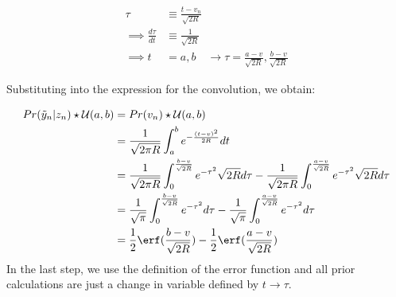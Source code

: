 \begin{align}
\tau & \equiv \frac{t-v_n}{\sqrt{2R}} \\
\implies \frac{d\tau}{dt} & \equiv \frac{1}{\sqrt{2R}} \\
\implies t& = a, b \quad \to \tau = \frac{a-v}{\sqrt{2R}}, \frac{b-v}{\sqrt{2R}} 
\end{align}

Substituting into the expression for the convolution, we obtain:

\begin{align}
Pr( \tilde{y}_n | z_n) \star \mathcal{U}(a,b) & =  Pr( v_n) \star \mathcal{U}(a,b) \\
& = \frac{1}{\sqrt{2\pi R}} \int_{a}^{b} e^{-\frac{(t-v)^2}{2R}} dt\\
& = \frac{1}{\sqrt{2\pi R}} \int_{0}^{\frac{b-v}{\sqrt{2R}} } e^{-\tau^2} \sqrt{2 R} d\tau  - \frac{1}{\sqrt{2\pi R}} \int_{0}^{\frac{a-v}{\sqrt{2R}}} e^{-\tau^2} \sqrt{2 R} d\tau \\
& = \frac{1}{\sqrt{\pi }} \int_{0}^{\frac{b-v}{\sqrt{2R}} } e^{-\tau^2} d\tau  - \frac{1}{\sqrt{\pi }} \int_{0}^{\frac{a-v}{\sqrt{2R}}} e^{-\tau^2} d\tau \\
& = \frac{1}{2} \erf(\frac{b-v}{\sqrt{2R}}) - \frac{1}{2} \erf(\frac{a-v}{\sqrt{2R}})
\end{align}
In the last step, we use the definition of the error function and all prior calculations are just a change in variable defined by $ t \to \tau$.

